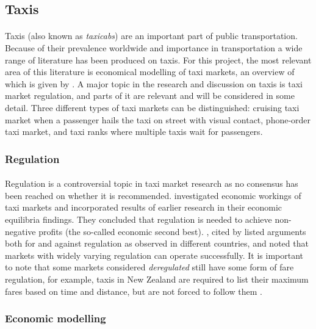 \subsection{Taxis}
\label{sec:literature:taxis}

\paragraph{} Taxis (also known as \textit{taxicabs}) are an important part of
public transportation. Because of their prevalence worldwide and importance in
transportation a wide range of literature has been produced on taxis. For this
project, the most relevant area of this literature is economical modelling of
taxi markets, an overview of which is given by
\textcite{Salanova2011taxi+review}. A major topic in the research and
discussion on taxis is taxi market regulation, and parts of it are relevant and
will be considered in some detail. Three different types of taxi markets can be
distinguished: cruising taxi market when a passenger hails the taxi on street
with visual contact, phone-order taxi market, and taxi ranks where multiple
taxis wait for passengers.

\subsubsection{Regulation}

\paragraph{}Regulation is a controversial topic in taxi market research as no
consensus has been reached on whether it is recommended.
\textcite{Cairns1996taxi+competition} investigated economic workings of taxi
markets and incorporated results of earlier research in their economic
equilibria findings. They concluded that regulation is needed to achieve non-
negative profits (the so-called economic second best).
\textcite{Oecd2007taxi+policy}, cited by \textcite{Salanova2011taxi+review}
listed arguments both for and against regulation as observed in different
countries, and noted that markets with widely varying regulation can operate
successfully. It is important to note that some markets considered
\textit{deregulated} still have some form of fare regulation, for example,
taxis in New Zealand are required to list their maximum fares based on time and
distance, but are not forced to follow them
\parencite{Gaunt1995taxi+newzealand}.

\subsubsection{Economic modelling} 

